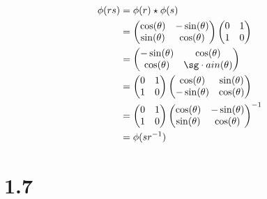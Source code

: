 \begin{enumerate}
	      \begin{align*}
		      \phi(rs) & = \phi(r) \star \phi(s)                      \\
		               & = \begin{pmatrix}
			                   \cos (\theta) & -\sin(\theta) \\
			                   \sin (\theta) & \cos(\theta)
		                   \end{pmatrix}\begin{pmatrix}
			                                0 & 1 \\
			                                1 & 0
		                                \end{pmatrix}              \\
		               & = \begin{pmatrix}
			                   -\sin(\theta) & \cos (\theta) \\
			                   \cos(\theta)  & \sg \cdot ain (\theta)
		                   \end{pmatrix}              \\
		               & = \begin{pmatrix}
			                   0 & 1 \\
			                   1 & 0
		                   \end{pmatrix}\begin{pmatrix}
			                                \cos (\theta)  & \sin(\theta) \\
			                                -\sin (\theta) & \cos(\theta)
		                                \end{pmatrix} \\
		               & = \begin{pmatrix}
			                   0 & 1 \\
			                   1 & 0
		                   \end{pmatrix}\begin{pmatrix}
			                                \cos (\theta) & -\sin(\theta) \\
			                                \sin (\theta) & \cos(\theta)
		                                \end{pmatrix}^{-1} \\
		               & = \phi(sr^{-1})
	      \end{align*}
\end{enumerate}

\section*{1.7}

